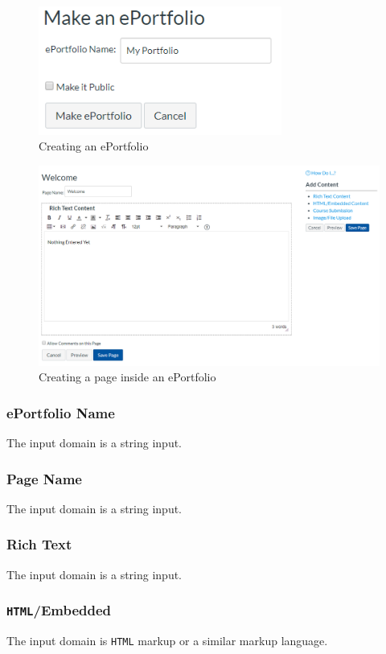 \documentclass[10pt,letterpaper]{article}
\begin{document}
\begin{figure}[h!]
	\centerline{\includegraphics[width=8cm]{screenshots/create-eportfolio.png}}
	\caption{Creating an ePortfolio}
\end{figure}
\begin{figure}[h!]
	\centerline{\includegraphics[width=12cm]{screenshots/create-eportfolio-page.png}}
	\caption{Creating a page inside an ePortfolio}
\end{figure}

\newpage
\subsubsection{ePortfolio Name}
The input domain is a string input.

\subsubsection{Page Name}
The input domain is a string input.

\subsubsection{Rich Text}
The input domain is a string input.

\subsubsection{\texttt{HTML}/Embedded}
The input domain is \texttt{HTML} markup or a similar markup language.
\end{document}
